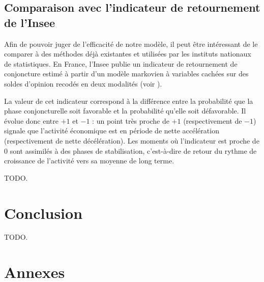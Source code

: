 \documentclass[10pt,french,french]{article}
\begin{document}
\hypertarget{sec:indretFr}{%
\subsection{Comparaison avec l'indicateur de retournement de l'Insee}\label{sec:indretFr}}

Afin de pouvoir juger de l'efficacité de notre modèle, il peut être intéressant de le comparer à des méthodes déjà existantes et utilisées par les instituts nationaux de statistiques.
En France, l'Insee publie un indicateur de retournement de conjoncture estimé à partir d'un modèle markovien à variables cachées sur des soldes d'opinion recodés en deux modalités (voir \cite{indretFR}).

La valeur de cet indicateur correspond à la différence entre la probabilité que la phase conjoncturelle soit favorable et la probabilité qu'elle soit défavorable.
Il évolue donc entre \(+1\) et \(-1\) : un point très proche de \(+1\) (respectivement de \(-1\)) signale que l'activité économique est en période de nette accélération (respectivement de nette décélération).
Les moments où l'indicateur est proche de 0 sont assimilés à des phases de stabilisation, c'est-à-dire de retour du rythme de croissance de l'activité vers sa moyenne de long terme.

TODO.

\hypertarget{conclusion}{%
\section{Conclusion}\label{conclusion}}

TODO.

\newpage

\hypertarget{annexes}{%
\section{Annexes}\label{annexes}}
\end{document}
